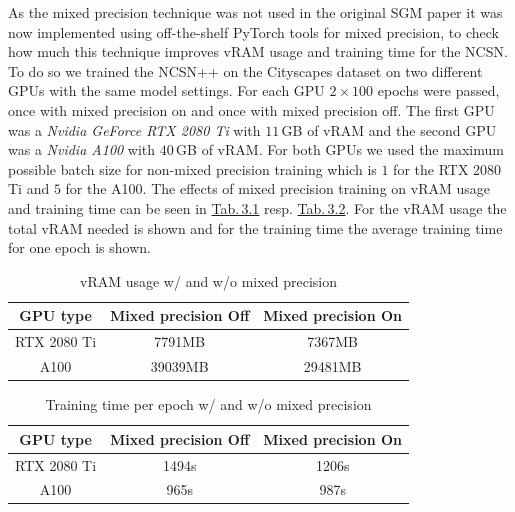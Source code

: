 As the mixed precision technique was not used in the original SGM paper \cite{score_3} it was now implemented using off-the-shelf PyTorch tools for mixed precision, to check how much this technique improves vRAM usage and training time for the NCSN. To do so we trained the NCSN++ on the Cityscapes dataset on two different GPUs with the same model settings. For each GPU $2\times100$ epochs were passed, once with mixed precision on and once with mixed precision off. The first GPU was a \textit{Nvidia GeForce RTX 2080 Ti} with $11$\,GB of vRAM and the second GPU was a \textit{Nvidia A100} with $40$\,GB of vRAM. For both GPUs we used the maximum possible batch size for non-mixed precision training which is $1$ for the RTX 2080 Ti and $5$ for the A100. The effects of mixed precision training on vRAM usage and training time can be seen in \hyperref[tab:3.1]{Tab.\,3.1} resp. \hyperref[tab:3.1]{Tab.\,3.2}. For the vRAM usage the total vRAM needed is shown and for the training time the average training time for one epoch is shown.
%
\begin{table}[] \label{tab:3.1}
        \centering
    \begin{tabular}{c|c|c}
        \toprule
        GPU type        & Mixed precision \textbf{Off}    & Mixed precision \textbf{On} \\
        \midrule
        RTX 2080 Ti     &  7791MB               & 7367MB\\
        A100            &  39039MB              & 29481MB\\
        \bottomrule
    \end{tabular}
    \caption{vRAM usage w/ and w/o mixed precision}
\end{table}
\begin{table}[b] \label{tab:3.2}
        \centering
    \begin{tabular}{c|c|c}
        \toprule
        GPU type        & Mixed precision \textbf{Off}    & Mixed precision \textbf{On} \\
        \midrule
        RTX 2080 Ti     &  1494s                & 1206s    \\
        A100            &  965s                 & 987s\\
        \bottomrule
    \end{tabular}
    \caption{Training time per epoch w/ and w/o mixed precision}
\end{table}

